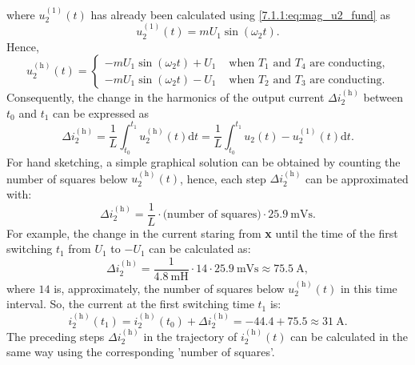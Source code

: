 \begin{solutionblock}
    where $u^{(1)}_\mathrm{2}(t)$ has already been calculated using \eqref{7.1.1:eq:mag_u2_fund} as
    \begin{equation}
        u^{(1)}_\mathrm{2}(t) = m U_{\mathrm{1}} \sin(\omega_2 t).         
    \end{equation}
    Hence,
    \begin{equation}
        u^{(\mathrm{h})}_\mathrm{2}(t) =  \begin{cases}
            - m U_{\mathrm{1}} \sin(\omega_2 t) + U_{\mathrm{1}} &\text{ when $T_1$ and $T_4$ are conducting,}\\
            - m U_{\mathrm{1}} \sin(\omega_2 t)  - U_{\mathrm{1}} &\text{ when $T_2$ and $T_3$ are conducting}.
            \end{cases}
        \label{7.1.2:eq:u_2_harm_cases}         
    \end{equation}
    Consequently, the change in the harmonics of the output current $\Delta i^{(\mathrm{h})}_\mathrm{2}$ between $t_0$ and $t_1$ can be expressed as 
    \begin{equation}
        \Delta i^{(\mathrm{h})}_\mathrm{2} = \frac{1}{L} \int_{t_0}^{t_1} u^{(\mathrm{h})}_\mathrm{2}(t) \mathrm{d}t = \frac{1}{L} \int_{t_0}^{t_1} u_\mathrm{2}(t) - u^{(1)}_\mathrm{2}(t) \mathrm{d}t.
        \label{7.1.2:eq:i_2_harm}         
    \end{equation}
    For hand sketching, a simple graphical solution can be obtained by counting the number of squares below $u^{(\mathrm{h})}_\mathrm{2}(t)$, hence,
    each step $\Delta i^{(\mathrm{h})}_\mathrm{2}$ can be approximated with:
        \begin{equation}
            \Delta i^{(\mathrm{h})}_\mathrm{2} = \frac{1}{L} \cdot \text{(number of squares)} \cdot \SI{25.9}{\milli \volt \second}.
            \label{7.1.2:eq:approx_i_2_harm}         
        \end{equation}
        For example, the change in the current staring from \textbf{x} until the time of the first switching $t_1$ from $U_1$ to $-U_1$ can be calculated as:
        \begin{equation}
            \Delta i^{(\mathrm{h})}_\mathrm{2} = \frac{1}{\SI{4.8}{\milli \henry}} \cdot 14 \cdot \SI{25.9}{\milli \volt \second} \approx \SI{75.5}{\ampere},
            \label{7.1.2:eq:approx_i_2_harm_example}         
        \end{equation}
        where $14$ is, approximately, the number of squares below $u^{(\mathrm{h})}_\mathrm{2}(t)$ in this time interval. So, the current at the first switching time $t_1$ is:
        \begin{equation}
            i^{(\mathrm{h})}_\mathrm{2}(t_1) = i^{(\mathrm{h})}_\mathrm{2}(t_0) + \Delta i^{(\mathrm{h})}_\mathrm{2} = -44.4 + 75.5 \approx \SI{31}{\ampere}.
            \label{7.1.2:eq:approx_i_2_harm_t1}         
        \end{equation}
        The preceding steps $\Delta i^{(\mathrm{h})}_\mathrm{2}$ in the trajectory of $i^{(\mathrm{h})}_\mathrm{2}(t)$ can be calculated in the same way
        using the corresponding 'number of squares'.  
\end{solutionblock}
